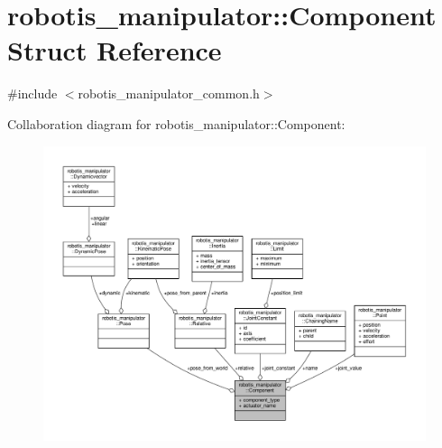 \hypertarget{structrobotis__manipulator_1_1_component}{}\section{robotis\+\_\+manipulator\+:\+:Component Struct Reference}
\label{structrobotis__manipulator_1_1_component}


{\ttfamily \#include $<$robotis\+\_\+manipulator\+\_\+common.\+h$>$}



Collaboration diagram for robotis\+\_\+manipulator\+:\+:Component\+:\nopagebreak
\begin{figure}[H]
\begin{center}
\leavevmode
\includegraphics[width=350pt]{structrobotis__manipulator_1_1_component__coll__graph}
\end{center}
\end{figure}
